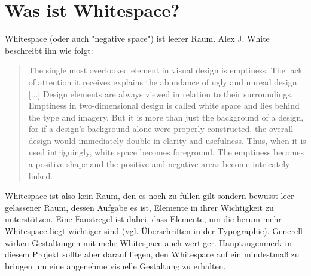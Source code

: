 
\section{Was ist Whitespace?}

Whitespace (oder auch "negative space") ist leerer Raum. Alex J. White beschreibt ihn wie folgt:

\begin{quote}
The single most overlooked element in visual design is emptiness. The lack of attention it receives explains the abundance of ugly and unread design. [...]
Design elements are always viewed in relation to their surroundings. Emptiness in two-dimensional design is called white space and lies behind the type and imagery. But it is more than just the background of a design, for if a design's background alone were properly constructed, the overall design would immediately double in clarity and usefulness. Thus, when it is used intriguingly, white space becomes foreground. The emptiness becomes a positive shape and the positive and negative areas become intricately linked.
\end{quote}

Whitespace ist also kein Raum, den es noch zu füllen gilt sondern bewusst leer gelassener Raum, dessen Aufgabe es ist, Elemente in ihrer Wichtigkeit zu unterstützen. Eine Faustregel ist dabei, dass Elemente, um die herum mehr Whitespace liegt wichtiger sind (vgl. Überschriften in der Typographie). Generell wirken Gestaltungen mit mehr Whitespace auch wertiger.
Hauptaugenmerk in diesem Projekt sollte aber darauf liegen, den Whitespace auf ein mindestmaß zu bringen um eine angenehme visuelle Gestaltung zu erhalten.

\clearpage
